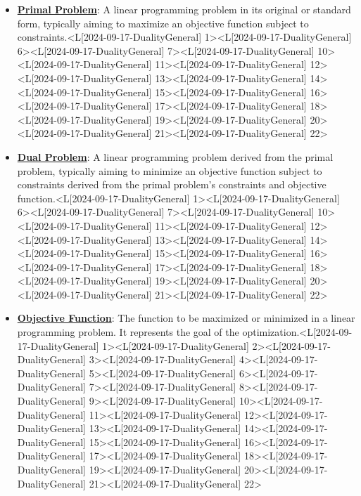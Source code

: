 \documentclass{article}%
\begin{document}
\begin{itemize}[[leftmargin=*]]%
\item \href{https://www.math.purdue.edu/~yipn/421/2024-09-17-DualityGeneral.pdf#page=1}{\textbf{Primal Problem}}: A linear programming problem in its original or standard form, typically aiming to maximize an objective function subject to constraints.<L[2024-09-17-DualityGeneral] 1><L[2024-09-17-DualityGeneral] 6><L[2024-09-17-DualityGeneral] 7><L[2024-09-17-DualityGeneral] 10><L[2024-09-17-DualityGeneral] 11><L[2024-09-17-DualityGeneral] 12><L[2024-09-17-DualityGeneral] 13><L[2024-09-17-DualityGeneral] 14><L[2024-09-17-DualityGeneral] 15><L[2024-09-17-DualityGeneral] 16><L[2024-09-17-DualityGeneral] 17><L[2024-09-17-DualityGeneral] 18><L[2024-09-17-DualityGeneral] 19><L[2024-09-17-DualityGeneral] 20><L[2024-09-17-DualityGeneral] 21><L[2024-09-17-DualityGeneral] 22>%
\item \href{https://www.math.purdue.edu/~yipn/421/2024-09-17-DualityGeneral.pdf#page=1}{\textbf{Dual Problem}}: A linear programming problem derived from the primal problem, typically aiming to minimize an objective function subject to constraints derived from the primal problem's constraints and objective function.<L[2024-09-17-DualityGeneral] 1><L[2024-09-17-DualityGeneral] 6><L[2024-09-17-DualityGeneral] 7><L[2024-09-17-DualityGeneral] 10><L[2024-09-17-DualityGeneral] 11><L[2024-09-17-DualityGeneral] 12><L[2024-09-17-DualityGeneral] 13><L[2024-09-17-DualityGeneral] 14><L[2024-09-17-DualityGeneral] 15><L[2024-09-17-DualityGeneral] 16><L[2024-09-17-DualityGeneral] 17><L[2024-09-17-DualityGeneral] 18><L[2024-09-17-DualityGeneral] 19><L[2024-09-17-DualityGeneral] 20><L[2024-09-17-DualityGeneral] 21><L[2024-09-17-DualityGeneral] 22>%
\item \href{https://www.math.purdue.edu/~yipn/421/2024-09-17-DualityGeneral.pdf#page=1}{\textbf{Objective Function}}: The function to be maximized or minimized in a linear programming problem. It represents the goal of the optimization.<L[2024-09-17-DualityGeneral] 1><L[2024-09-17-DualityGeneral] 2><L[2024-09-17-DualityGeneral] 3><L[2024-09-17-DualityGeneral] 4><L[2024-09-17-DualityGeneral] 5><L[2024-09-17-DualityGeneral] 6><L[2024-09-17-DualityGeneral] 7><L[2024-09-17-DualityGeneral] 8><L[2024-09-17-DualityGeneral] 9><L[2024-09-17-DualityGeneral] 10><L[2024-09-17-DualityGeneral] 11><L[2024-09-17-DualityGeneral] 12><L[2024-09-17-DualityGeneral] 13><L[2024-09-17-DualityGeneral] 14><L[2024-09-17-DualityGeneral] 15><L[2024-09-17-DualityGeneral] 16><L[2024-09-17-DualityGeneral] 17><L[2024-09-17-DualityGeneral] 18><L[2024-09-17-DualityGeneral] 19><L[2024-09-17-DualityGeneral] 20><L[2024-09-17-DualityGeneral] 21><L[2024-09-17-DualityGeneral] 22>%

\end{itemize}
\end{document}
